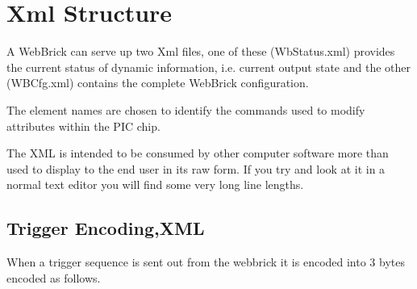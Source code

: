 \section {Xml Structure}

A WebBrick can serve up two Xml files, one of these (WbStatus.xml) provides the current status of dynamic information, i.e.
current output state and the other (WBCfg.xml) contains the complete WebBrick configuration.

The element names are chosen to identify the commands used to modify attributes within the PIC chip.

The XML is intended to be consumed by other computer software more than used to display to the end user in its raw form. If
you try and look at it in a normal text editor you will find some very long line lengths.

\subsection{Trigger Encoding,XML}
    When a trigger sequence is sent out from the webbrick it is encoded into 3 bytes encoded as 
    follows.

